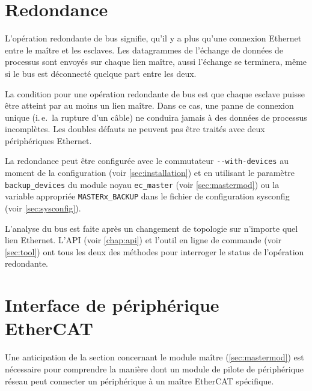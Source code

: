 \documentclass[a4paper,12pt,BCOR6mm,bibtotoc,idxtotoc]{scrbook}
\begin{document}

\section{Redondance}
\label{sec:redundancy}

L'op\'eration redondante de bus signifie, qu'il y a plus qu'une
connexion Ethernet entre le ma\^itre et les esclaves.  Les
datagrammes de l'\'echange de donn\'ees de processus sont envoy\'es
sur chaque lien ma\^itre, aussi l'\'echange se terminera, m\^eme si le
bus est d\'econnect\'e quelque part entre les deux.

La condition pour une op\'eration redondante de bus est que chaque
esclave puisse \^etre atteint par au moins un lien ma\^itre. Dans ce
cas, une panne de connexion unique (i.\,e.~la rupture d'un c\^able) ne
conduira jamais \`a des donn\'ees de processus incompl\`etes.  Les
doubles d\'efauts ne peuvent pas \^etre trait\'es avec deux
p\'eriph\'eriques Ethernet.

La redondance peut \^etre configur\'ee avec le commutateur
\lstinline+--with-devices+ au moment de la configuration (voir
\autoref{sec:installation}) et en utilisant le param\`etre
\lstinline+backup_devices+ du module noyau \lstinline+ec_master+ (voir
\autoref{sec:mastermod}) ou la variable appropri\'ee
\lstinline+MASTERx_BACKUP+ dans le fichier de configuration sysconfig
(voir \autoref{sec:sysconfig}).

L'analyse du bus est faite apr\`es un changement de topologie sur
n'importe quel lien Ethernet. L'API (voir \autoref{chap:api}) et
l'outil en ligne de commande (voir \autoref{sec:tool}) ont tous les
deux des m\'ethodes pour interroger le status de l'op\'eration redondante.


\section{Interface de p\'eriph\'erique EtherCAT}
\label{sec:ecdev}

Une anticipation de la section concernant le module ma\^itre
(\autoref{sec:mastermod}) est n\'ecessaire pour comprendre la
mani\`ere dont un module de pilote de p\'eriph\'erique r\'eseau peut
connecter un p\'eriph\'erique \`a un ma\^itre EtherCAT sp\'ecifique.
\end{document}
